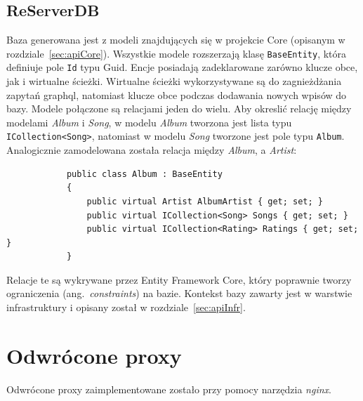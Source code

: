 	\subsection{ReServerDB}\label{sec:ReServerDB}
		Baza generowana jest z modeli znajdujących się w projekcie Core (opisanym w rozdziale~\ref{sec:apiCore}).
		Wszystkie modele rozszerzają klasę \verb|BaseEntity|, która definiuje pole \verb|Id| typu Guid.
		Encje posiadają zadeklarowane zarówno klucze obce, jak i wirtualne ścieżki.
		Wirtualne ścieżki wykorzystywane są do zagnieżdżania zapytań graphql, natomiast klucze obce podczas dodawania nowych wpisów do bazy.
		Modele połączone są relacjami jeden do wielu.
		Aby okreslić relację między modelami \emph{Album} i \emph{Song}, w modelu \emph{Album} tworzona jest lista typu \verb|ICollection<Song>|,
		natomiast w modelu \emph{Song} tworzone jest pole typu \verb|Album|.
		Analogicznie zamodelowana została relacja między \emph{Album}, a \emph{Artist}:
		\begin{lstlisting}
			public class Album : BaseEntity
			{
				public virtual Artist AlbumArtist { get; set; }
				public virtual ICollection<Song> Songs { get; set; }
				public virtual ICollection<Rating> Ratings { get; set; }
			}
		\end{lstlisting}
		Relacje te są wykrywane przez Entity Framework Core, który poprawnie tworzy ograniczenia (ang.\ \emph{constraints}) na bazie.
		Kontekst bazy zawarty jest w warstwie infrastruktury i opisany został w rozdziale~\ref{sec:apiInfr}.

\section{Odwrócone proxy}
	Odwrócone proxy zaimplementowane zostało przy pomocy narzędzia \emph{nginx}.
	